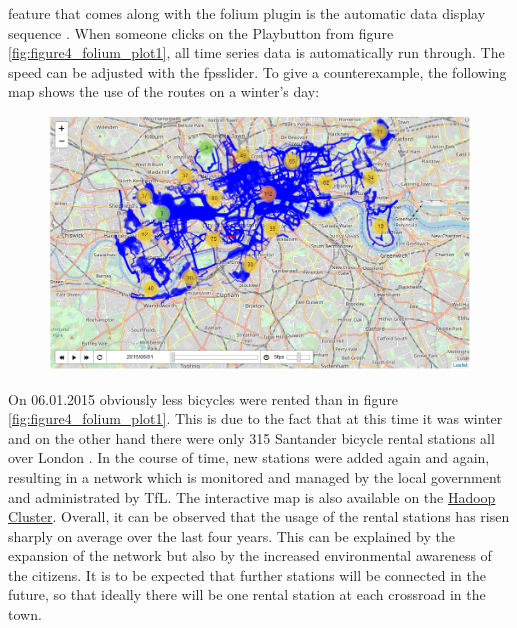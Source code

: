 feature that comes along with the folium plugin is the automatic data display sequence \cite{RN5}. When
someone clicks on the \glqq Play\grqq button from figure \ref{fig:figure4_folium_plot1}, all time series data is automatically run through.
The speed can be adjusted with the \glqq fps\grqq slider.
To give a counterexample, the following map shows the use of the routes on a winter’s day:
\begin{figure}[H]
\begin{center}
\includegraphics[width=1\textwidth]{img/figure5_folium_plot2}\label{fig:figure5_folium_plot2}
\label{fig:figure5_folium_plot2}
\end{center}
\end{figure}
On 06.01.2015 obviously less bicycles were rented than in figure \ref{fig:figure4_folium_plot1}. This is due to the fact that at
this time it was winter and on the other hand there were only 315 Santander bicycle rental stations
all over London \cite{RN6}. In the course of time, new stations were added again and again, resulting in
a network which is monitored and managed by the local government and administrated by TfL.
The interactive map is also available on the \href{http://i-hadoop-01.informatik.hs-ulm.de/routes_frequency.html}{Hadoop Cluster}.
Overall, it can be observed that the usage of the rental stations has risen sharply on average over
the last four years. This can be explained by the expansion of the network but also by the increased
environmental awareness of the citizens. It is to be expected that further stations will be connected
in the future, so that ideally there will be one rental station at each crossroad in the town.

